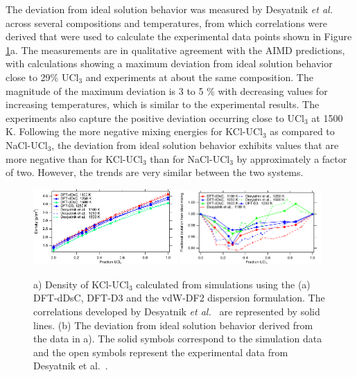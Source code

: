 \documentclass[preprint,3p,10pt,twocolumn,number,sort&compress]{elsarticle}
\begin{document}
The deviation from ideal solution behavior was measured by Desyatnik \textit{et al.}~\cite{DesyatnikKCl} across several compositions and temperatures, from which correlations were derived that were used to calculate the experimental data points shown in Figure \ref{fig:density}a. The measurements are in qualitative agreement with the AIMD predictions, with calculations showing a maximum deviation from ideal solution behavior close to 29\% UCl$_3$ and experiments at about the same composition. 
The magnitude of the maximum deviation is 3 to 5 \% with decreasing values for increasing temperatures, which is similar to the experimental results. The experiments also capture the positive deviation occurring close to UCl$_3$ at 1500 K. Following the more negative mixing energies for KCl-UCl$_3$ as compared to NaCl-UCl$_3$, the deviation from ideal solution behavior exhibits values that are more negative than for KCl-UCl$_3$ than for NaCl-UCl$_3$ by approximately a factor of two. However, the trends are very similar between the two systems. 

\begin{figure}[htb]
\centering
\includegraphics[width=0.49\textwidth]{KCl_UCl3_density.pdf} \includegraphics[width=0.48\textwidth]{KCl_UCl3_density_rel.pdf}
\caption{a) Density of KCl-UCl$_3$ calculated from simulations using the (a) DFT-dDsC, DFT-D3 and the vdW-DF2 dispersion formulation. The correlations developed by Desyatnik \textit{et al.}~\cite{DesyatnikKCl} are represented by solid lines. (b) The deviation from ideal solution behavior derived from the data in a). The solid symbols correspond to the simulation data and the open symbols represent the experimental data from Desyatnik et al.~\cite{DesyatnikKCl}.}
\label{fig:density}
\end{figure}
\end{document}
